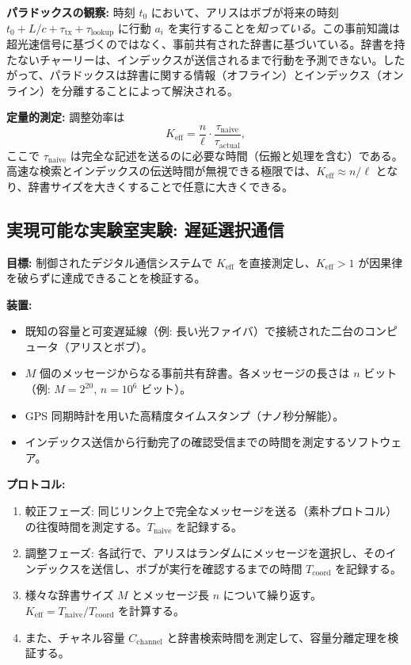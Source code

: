 \documentclass[12pt,a4paper]{ltjsarticle}
\begin{document}
	\textbf{パラドックスの観察:}
	時刻 \(t_0\) において、アリスはボブが将来の時刻 \(t_0 + L/c + \tau_{\text{tx}} + \tau_{\text{lookup}}\) に行動 \(a_i\) を実行することを\emph{知っている}。この事前知識は超光速信号に基づくのではなく、事前共有された辞書に基づいている。辞書を持たないチャーリーは、インデックスが送信されるまで行動を予測できない。したがって、パラドックスは辞書に関する情報（オフライン）とインデックス（オンライン）を分離することによって解決される。
	
	\textbf{定量的測定:}
	調整効率は
	\[
	K_{\mathrm{eff}} = \frac{n}{\ell} \cdot \frac{\tau_{\text{naive}}}{\tau_{\text{actual}}},
	\]
	ここで \(\tau_{\text{naive}}\) は完全な記述を送るのに必要な時間（伝搬と処理を含む）である。高速な検索とインデックスの伝送時間が無視できる極限では、\(K_{\mathrm{eff}} \approx n/\ell\) となり、辞書サイズを大きくすることで任意に大きくできる。
	
	\subsection{実現可能な実験室実験: 遅延選択通信}
	\label{subsec:lab-delayed-choice}
	
	\textbf{目標:} 制御されたデジタル通信システムで \(K_{\mathrm{eff}}\) を直接測定し、\(K_{\mathrm{eff}} > 1\) が因果律を破らずに達成できることを検証する。
	
	\textbf{装置:}
	\begin{itemize}
		\item 既知の容量と可変遅延線（例: 長い光ファイバ）で接続された二台のコンピュータ（アリスとボブ）。
		\item \(M\) 個のメッセージからなる事前共有辞書。各メッセージの長さは \(n\) ビット（例: \(M = 2^{20}\), \(n = 10^6\) ビット）。
		\item GPS 同期時計を用いた高精度タイムスタンプ（ナノ秒分解能）。
		\item インデックス送信から行動完了の確認受信までの時間を測定するソフトウェア。
	\end{itemize}
	
	\textbf{プロトコル:}
	\begin{enumerate}
		\item 較正フェーズ: 同じリンク上で完全なメッセージを送る（素朴プロトコル）の往復時間を測定する。\(T_{\text{naive}}\) を記録する。
		\item 調整フェーズ: 各試行で、アリスはランダムにメッセージを選択し、そのインデックスを送信し、ボブが実行を確認するまでの時間 \(T_{\text{coord}}\) を記録する。
		\item 様々な辞書サイズ \(M\) とメッセージ長 \(n\) について繰り返す。\(K_{\mathrm{eff}} = T_{\text{naive}} / T_{\text{coord}}\) を計算する。
		\item また、チャネル容量 \(C_{\text{channel}}\) と辞書検索時間を測定して、容量分離定理を検証する。
	\end{enumerate}
	
\end{document}

